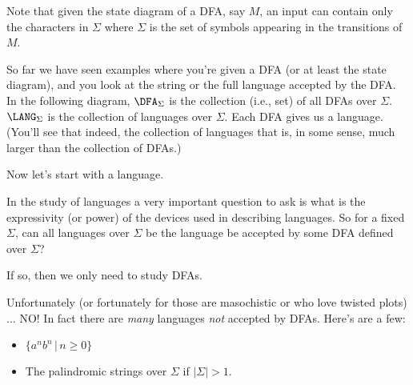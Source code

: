 Note that given the state diagram of a DFA, say $M$, 
an input can contain only the 
characters in $\Sigma$ where $\Sigma$ is the set of symbols appearing in the
transitions of $M$.








\newpage
So far we have seen examples where you're given a DFA (or at least the state
diagram), and you look at the string or the full language accepted by the DFA.
In the following diagram, $\DFA_\Sigma$ is the collection (i.e., set)
of all DFAs over $\Sigma$.
$\LANG_\Sigma$ is the collection of languages over $\Sigma$.
Each DFA gives us a language.
(You'll see that indeed, the collection of languages that is,
in some sense, much larger than the collection of DFAs.)



Now let's start with a language.




























\newpage
In the study of languages a very important question to ask is what
is the expressivity (or power) of the devices used in describing
languages. So for a  fixed $\Sigma$, can all languages over $\Sigma$
be the language be accepted by some DFA defined over $\Sigma$?

If so, then we only need to study DFAs.

Unfortunately (or fortunately for those are masochistic or who love
twisted plots) $\ldots$ NO! In fact there are
\textit{many} languages
\textit{not} accepted by DFAs. Here's are a few: 
\begin{itemize}
 \item $\{a^nb^n \,|\, n\geq 0\}$
 \item The palindromic strings over $\Sigma$ if $|\Sigma|>1$.
\end{itemize}
